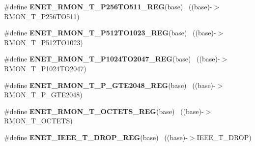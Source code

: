 \begin{DoxyCompactItemize}
\item 
\hypertarget{group___e_n_e_t___register___accessor___macros_gab242907225e629809ca2f6ead8f42abc}{}\#define {\bfseries E\+N\+E\+T\+\_\+\+R\+M\+O\+N\+\_\+\+T\+\_\+\+P256\+T\+O511\+\_\+\+R\+E\+G}(base)                ~((base)-\/$>$R\+M\+O\+N\+\_\+\+T\+\_\+\+P256\+T\+O511)\label{group___e_n_e_t___register___accessor___macros_gab242907225e629809ca2f6ead8f42abc}

\item 
\hypertarget{group___e_n_e_t___register___accessor___macros_gab777ed769c9e576e61a135cf2b08b0d2}{}\#define {\bfseries E\+N\+E\+T\+\_\+\+R\+M\+O\+N\+\_\+\+T\+\_\+\+P512\+T\+O1023\+\_\+\+R\+E\+G}(base)              ~((base)-\/$>$R\+M\+O\+N\+\_\+\+T\+\_\+\+P512\+T\+O1023)\label{group___e_n_e_t___register___accessor___macros_gab777ed769c9e576e61a135cf2b08b0d2}

\item 
\hypertarget{group___e_n_e_t___register___accessor___macros_gaf97ad637bd93b4f1e90b0fa4b758ac85}{}\#define {\bfseries E\+N\+E\+T\+\_\+\+R\+M\+O\+N\+\_\+\+T\+\_\+\+P1024\+T\+O2047\+\_\+\+R\+E\+G}(base)            ~((base)-\/$>$R\+M\+O\+N\+\_\+\+T\+\_\+\+P1024\+T\+O2047)\label{group___e_n_e_t___register___accessor___macros_gaf97ad637bd93b4f1e90b0fa4b758ac85}

\item 
\hypertarget{group___e_n_e_t___register___accessor___macros_ga802fee5c93eb1f30a56a90478cfd17c7}{}\#define {\bfseries E\+N\+E\+T\+\_\+\+R\+M\+O\+N\+\_\+\+T\+\_\+\+P\+\_\+\+G\+T\+E2048\+\_\+\+R\+E\+G}(base)                ~((base)-\/$>$R\+M\+O\+N\+\_\+\+T\+\_\+\+P\+\_\+\+G\+T\+E2048)\label{group___e_n_e_t___register___accessor___macros_ga802fee5c93eb1f30a56a90478cfd17c7}

\item 
\hypertarget{group___e_n_e_t___register___accessor___macros_gae46f6ed7439c0a08c0c56c138c38b378}{}\#define {\bfseries E\+N\+E\+T\+\_\+\+R\+M\+O\+N\+\_\+\+T\+\_\+\+O\+C\+T\+E\+T\+S\+\_\+\+R\+E\+G}(base)                      ~((base)-\/$>$R\+M\+O\+N\+\_\+\+T\+\_\+\+O\+C\+T\+E\+T\+S)\label{group___e_n_e_t___register___accessor___macros_gae46f6ed7439c0a08c0c56c138c38b378}

\item 
\hypertarget{group___e_n_e_t___register___accessor___macros_ga74499226d8f9c6a5189f24e554e96460}{}\#define {\bfseries E\+N\+E\+T\+\_\+\+I\+E\+E\+E\+\_\+\+T\+\_\+\+D\+R\+O\+P\+\_\+\+R\+E\+G}(base)                          ~((base)-\/$>$I\+E\+E\+E\+\_\+\+T\+\_\+\+D\+R\+O\+P)\label{group___e_n_e_t___register___accessor___macros_ga74499226d8f9c6a5189f24e554e96460}


\end{DoxyCompactItemize}
